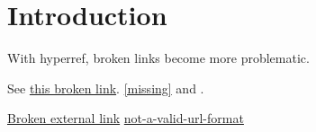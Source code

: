 \documentclass{article}
\begin{document}
\section{Introduction}\label{intro}
With hyperref, broken links become more problematic.

See \hyperref[nonexistent]{this broken link}.
\autoref{missing} and .

\href{http://broken-url}{Broken external link}
\url{not-a-valid-url-format}
\end{document}
